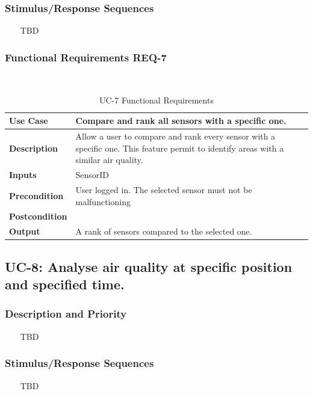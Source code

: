 \documentclass{report}
\begin{document}
\subsubsection*{Stimulus/Response Sequences} ~~~
TBD

\subsubsection*{Functional Requirements REQ-7} ~~~
\begin{table}[H]
	\begin{center}
		\begin{tabular}{|m{4cm}|m{10cm}|}
		\hline
		\textbf{Use Case} & Compare and rank all sensors with a specific one. \\
		\hline
		\textbf{Description} & Allow a user to compare and rank every sensor with a specific one. This feature permit to identify areas with a similar air quality.  \\
		\hline
		\textbf{Inputs} &  SensorID\\
		\hline
		\textbf{Precondition} & User logged in. The selected sensor must not be malfunctioning \\
		\hline
		\textbf{Postcondition} &  \\
		\hline
		\textbf{Output} & A rank of sensors compared to the selected one. \\
		\hline
		\end{tabular}
	\end{center}
	\caption{UC-7 Functional Requirements}
	\label{table:REQ-7}
\end{table}

\subsection{UC-8: Analyse air quality at specific position and specified time.}

\subsubsection*{Description and Priority} ~~~
TBD

\subsubsection*{Stimulus/Response Sequences} ~~~
TBD
\end{document}
